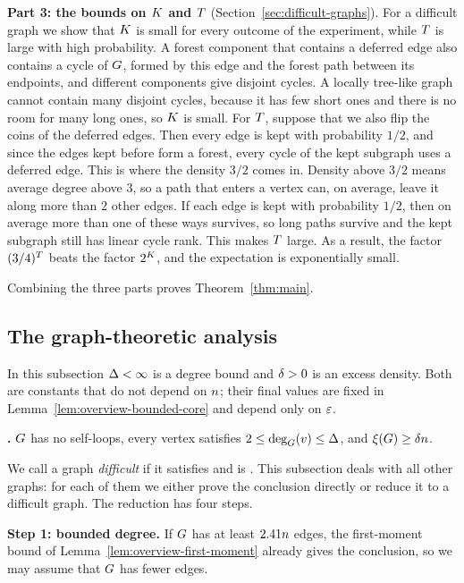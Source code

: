 \medskip
\noindent\textbf{Part 3: the bounds on \(K\) and \(T\)}
(Section~\ref{sec:difficult-graphs}). For a difficult graph we show that
\(K\) is small for every outcome of the experiment, while \(T\) is
large with high probability. A forest component that contains a deferred edge
also contains a cycle of \(G\), formed by this edge and the forest path
between its endpoints, and different components give disjoint cycles. A locally
tree-like graph cannot contain many disjoint cycles, because it has few short
ones and there is no room for many long ones, so \(K\) is small. For
\(T\), suppose that we also flip the coins of the deferred edges. Then
every edge is kept with probability \(1/2\), and since the edges kept before
form a forest, every cycle of the kept subgraph uses a deferred edge. This is
where the density \(3/2\) comes in. Density above \(3/2\) means average degree
above \(3\), so a path that enters a vertex can, on average, leave it along
more than \(2\) other edges. If each edge is kept with probability \(1/2\),
then on average more than one of these ways survives, so long paths survive
and the kept subgraph still has linear cycle rank. This makes
\(T\) large. As a result,
the factor \((3/4)^{T}\) beats the factor \(2^{K}\), and the
expectation is exponentially small.

\medskip
Combining the three parts proves Theorem~\ref{thm:main}.

\subsection{The graph-theoretic analysis}\label{subsec:overview-graph}

In this subsection \(\Delta<\infty\) is a degree bound and \(\delta>0\) is an
excess density. Both are constants that do not depend on \(n\); their
final values are fixed in Lemma~\ref{lem:overview-bounded-core} and depend only
on \(\varepsilon\).

\medskip
\noindent\textbf{\Hyp.} \(G\) has no self-loops, every vertex satisfies
\(2\le\deg_{G}(v)\le\Delta\), and \(\xi(G)\ge\delta n\).

\medskip
We call a graph \emph{difficult} if it satisfies \Hyp{} and is
\loctree{\rad}{\nontree}. This subsection deals with all other graphs: for each
of them we either prove the conclusion directly or reduce it to a difficult
graph. The reduction has four steps.

\medskip
\noindent\textbf{Step 1: bounded degree.} If \(G\) has at least
\(2.41n\) edges, the first-moment bound of
Lemma~\ref{lem:overview-first-moment} already gives the conclusion, so we may
assume that \(G\) has fewer edges.

